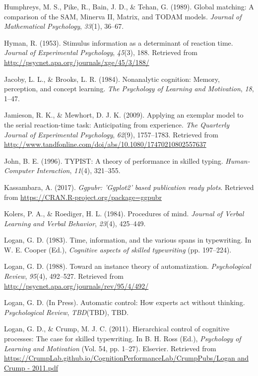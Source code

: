 \documentclass[floatsintext,man]{apa6}
\theoremstyle{definition}
\theoremstyle{definition}
\theoremstyle{definition}
\theoremstyle{remark}
\begin{document}
\hypertarget{ref-humphreys_global_1989}{}
Humphreys, M. S., Pike, R., Bain, J. D., \& Tehan, G. (1989). Global
matching: A comparison of the SAM, Minerva II, Matrix, and TODAM models.
\emph{Journal of Mathematical Psychology}, \emph{33}(1), 36--67.

\hypertarget{ref-hyman_stimulus_1953}{}
Hyman, R. (1953). Stimulus information as a determinant of reaction
time. \emph{Journal of Experimental Psychology}, \emph{45}(3), 188.
Retrieved from \url{http://psycnet.apa.org/journals/xge/45/3/188/}

\hypertarget{ref-JacobyNonanalyticcognitionMemory1984}{}
Jacoby, L. L., \& Brooks, L. R. (1984). Nonanalytic cognition: Memory,
perception, and concept learning. \emph{The Psychology of Learning and
Motivation}, \emph{18}, 1--47.

\hypertarget{ref-jamieson_applying_2009}{}
Jamieson, R. K., \& Mewhort, D. J. K. (2009). Applying an exemplar model
to the serial reaction-time task: Anticipating from experience.
\emph{The Quarterly Journal of Experimental Psychology}, \emph{62}(9),
1757--1783. Retrieved from
\url{http://www.tandfonline.com/doi/abs/10.1080/17470210802557637}

\hypertarget{ref-john_typist:_1996}{}
John, B. E. (1996). TYPIST: A theory of performance in skilled typing.
\emph{Human-Computer Interaction}, \emph{11}(4), 321--355.

\hypertarget{ref-R-ggpubr}{}
Kassambara, A. (2017). \emph{Ggpubr: 'Ggplot2' based publication ready
plots}. Retrieved from \url{https://CRAN.R-project.org/package=ggpubr}

\hypertarget{ref-KolersProceduresmind1984}{}
Kolers, P. A., \& Roediger, H. L. (1984). Procedures of mind.
\emph{Journal of Verbal Learning and Verbal Behavior}, \emph{23}(4),
425--449.

\hypertarget{ref-logan_span_1983}{}
Logan, G. D. (1983). Time, information, and the various spans in
typewriting. In W. E. Cooper (Ed.), \emph{Cognitive aspects of skilled
typewriting} (pp. 197--224).

\hypertarget{ref-logan_toward_1988}{}
Logan, G. D. (1988). Toward an instance theory of automatization.
\emph{Psychological Review}, \emph{95}(4), 492--527. Retrieved from
\url{http://psycnet.apa.org/journals/rev/95/4/492/}

\hypertarget{ref-logan_inpress}{}
Logan, G. D. (In Press). Automatic control: How experts act without
thinking. \emph{Psychological Review}, \emph{TBD}(TBD), TBD.

\hypertarget{ref-logan_hierarchical_2011}{}
Logan, G. D., \& Crump, M. J. C. (2011). Hierarchical control of
cognitive processes: The case for skilled typewriting. In B. H. Ross
(Ed.), \emph{Psychology of Learning and Motivation} (Vol. 54, pp.
1--27). Elsevier. Retrieved from
\href{https://CrumpLab.github.io/CognitionPerformanceLab/CrumpPubs/Logan\%20and\%20Crump\%20-\%202011.pdf}{https://CrumpLab.github.io/CognitionPerformanceLab/CrumpPubs/Logan and Crump - 2011.pdf}
\end{document}
